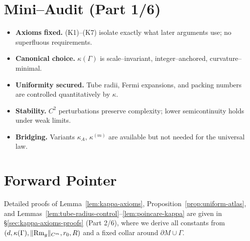 \bigskip

\section{Mini–Audit (Part 1/6)}
\label{sec:mini-audit-part1}

\begin{itemize}
\item \textbf{Axioms fixed.} (K1)–(K7) isolate exactly what later arguments use; no superfluous requirements.
\item \textbf{Canonical choice.} $\kappa(\Gamma)$ is scale–invariant, integer–anchored, curvature–minimal.
\item \textbf{Uniformity secured.} Tube radii, Fermi expansions, and packing numbers are controlled quantitatively by $\kappa$.
\item \textbf{Stability.} $C^2$ perturbations preserve complexity; lower semicontinuity holds under weak limits.
\item \textbf{Bridging.} Variants $\kappa_A$, $\kappa^{(m)}$ are available but not needed for the universal law.
\end{itemize}

\bigskip


\section*{Forward Pointer}
Detailed proofs of Lemma~\ref{lem:kappa-axioms}, Proposition~\ref{prop:uniform-atlas}, and Lemmas~\ref{lem:tube-radius-control}–\ref{lem:poincare-kappa} are given in \S\ref{sec:kappa-axioms-proofs} (Part 2/6), where we derive all constants from $(d,\kappa(\Gamma),\|{\rm Rm}_g\|_{C^m},r_0,R)$ and a fixed collar around $\partial M\cup\Gamma$.


